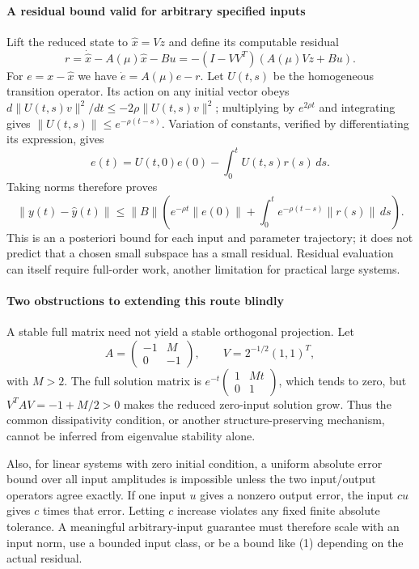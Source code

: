 \documentclass[11pt]{article}
\begin{document}
\paragraph{A residual bound valid for arbitrary specified inputs}
Lift the reduced state to $\widehat x=Vz$ and define its computable residual
\[
 r=\dot{\widehat x}-A(\mu)\widehat x-Bu
   =-(I-VV^T)(A(\mu)Vz+Bu).
\]
For $e=x-\widehat x$ we have $\dot e=A(\mu)e-r$. Let $U(t,s)$ be the homogeneous transition operator. Its action on any initial vector obeys
$d\lVert U(t,s)v\rVert^2/dt\leq-2\rho\lVert U(t,s)v\rVert^2$;
multiplying by $e^{2\rho t}$ and integrating gives $\lVert U(t,s)\rVert\leq e^{-\rho(t-s)}$. Variation of constants, verified by differentiating its expression, gives
\[
 e(t)=U(t,0)e(0)-\int_0^tU(t,s)r(s)\,ds.
\]
Taking norms therefore proves
\[
 \lVert y(t)-\widehat y(t)\rVert
 \leq\lVert B\rVert\left(e^{-\rho t}\lVert e(0)\rVert+
       \int_0^te^{-\rho(t-s)}\lVert r(s)\rVert\,ds\right).
 \tag{1}
\]
This is an a posteriori bound for each input and parameter trajectory; it does not predict that a chosen small subspace has a small residual. Residual evaluation can itself require full-order work, another limitation for practical large systems.

\paragraph{Two obstructions to extending this route blindly}
A stable full matrix need not yield a stable orthogonal projection. Let
\[
 A=\begin{pmatrix}-1&M\\0&-1\end{pmatrix},\qquad
 V=2^{-1/2}(1,1)^T,
\]
with $M>2$. The full solution matrix is $e^{-t}\begin{pmatrix}1&Mt\\0&1\end{pmatrix}$, which tends to zero, but $V^TAV=-1+M/2>0$ makes the reduced zero-input solution grow. Thus the common dissipativity condition, or another structure-preserving mechanism, cannot be inferred from eigenvalue stability alone.

Also, for linear systems with zero initial condition, a uniform absolute error bound over all input amplitudes is impossible unless the two input/output operators agree exactly. If one input $u$ gives a nonzero output error, the input $cu$ gives $c$ times that error. Letting $c$ increase violates any fixed finite absolute tolerance. A meaningful arbitrary-input guarantee must therefore scale with an input norm, use a bounded input class, or be a bound like (1) depending on the actual residual.
\end{document}
